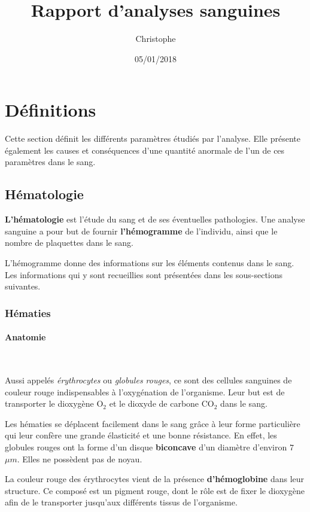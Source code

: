 \documentclass[12pt]{article}
\title{\textbf{Rapport d'analyses sanguines}}
\author{Christophe \bsc{Néraud}}
\date{05/01/2018}
\begin{document}
\maketitle

\tableofcontents


\section{Définitions}
Cette section définit les différents paramètres étudiés par l'analyse. Elle présente également les causes et conséquences d'une quantité anormale de l'un de ces paramètres dans le sang.

	\subsection{Hématologie}
\textbf{L'hématologie} est l'étude du sang et de ses éventuelles pathologies. Une analyse sanguine a pour but de fournir \textbf{l'hémogramme} de l'individu, ainsi que le nombre de plaquettes dans le sang.

L'hémogramme donne des informations sur les éléments contenus dans le sang. Les informations qui y sont recueillies sont présentées dans les sous-sections suivantes.

	\subsubsection{Hématies}
		\paragraph{Anatomie}\mbox{~}
				
	Aussi appelés \textit{érythrocytes} ou \textit{globules rouges}, ce sont des cellules sanguines de couleur rouge indispensables à l'oxygénation de l'organisme. Leur but est de transporter le dioxygène $\mathrm O_2$ et le dioxyde de carbone $\mathrm{CO}_2$ dans le sang.
	
	Les hématies se déplacent facilement dans le sang grâce à leur forme particulière qui leur confère une grande élasticité et une bonne résistance. En effet, les globules rouges ont la forme d'un disque \textbf{biconcave} d'un diamètre d'environ $7$ $\mu m$. Elles ne possèdent pas de noyau.
	
	La couleur rouge des érythrocytes vient de la présence \textbf{d'hémoglobine} dans leur structure. Ce composé est un pigment rouge, dont le rôle est de fixer le dioxygène afin de le transporter jusqu'aux différents tissus de l'organisme.
	
\end{document}
